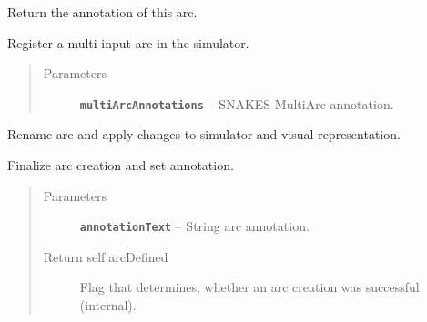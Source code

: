 \documentclass[a4paper,10pt,english]{sphinxmanual}
\begin{document}
\begin{fulllineitems}

\begin{fulllineitems}
\label{model_link:model.ArcItem.ArcItem.getName}
Return the annotation of this arc.

\end{fulllineitems}


\begin{fulllineitems}
\label{model_link:model.ArcItem.ArcItem.multiInput}
Register a multi input arc in the simulator.
\begin{quote}\begin{description}
\item[{Parameters}] \leavevmode
\textbf{\texttt{multiArcAnnotations}} -- SNAKES MultiArc annotation.

\end{description}\end{quote}

\end{fulllineitems}


\begin{fulllineitems}
\label{model_link:model.ArcItem.ArcItem.rename}
Rename arc and apply changes to simulator and visual representation.

\end{fulllineitems}


\begin{fulllineitems}
\label{model_link:model.ArcItem.ArcItem.setArcAnnotation}
Finalize arc creation and set annotation.
\begin{quote}\begin{description}
\item[{Parameters}] \leavevmode
\textbf{\texttt{annotationText}} -- String arc annotation.

\item[{Return self.arcDefined}] \leavevmode
Flag that determines, whether an arc creation was successful (internal).


\end{description}
\end{quote}
\end{fulllineitems}
\end{fulllineitems}
\end{document}
